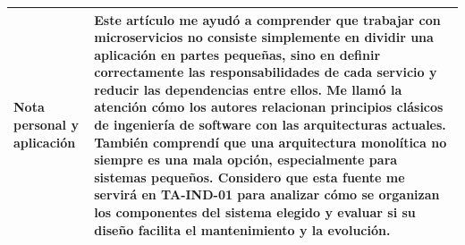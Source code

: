 \documentclass[11pt,a4paper]{article}
\begin{document}
\begin{longtable}{
|>{\raggedright\arraybackslash\bfseries}p{3.4cm}
|>{\raggedright\arraybackslash}p{11.6cm}|
}
Nota personal y aplicación
&
Este artículo me ayudó a comprender que trabajar con microservicios no consiste simplemente en dividir una aplicación en partes pequeñas, sino en definir correctamente las responsabilidades de cada servicio y reducir las dependencias entre ellos. Me llamó la atención cómo los autores relacionan principios clásicos de ingeniería de software con las arquitecturas actuales. También comprendí que una arquitectura monolítica no siempre es una mala opción, especialmente para sistemas pequeños. Considero que esta fuente me servirá en TA-IND-01 para analizar cómo se organizan los componentes del sistema elegido y evaluar si su diseño facilita el mantenimiento y la evolución.
\\
\hline

\end{longtable}

\end{document}
